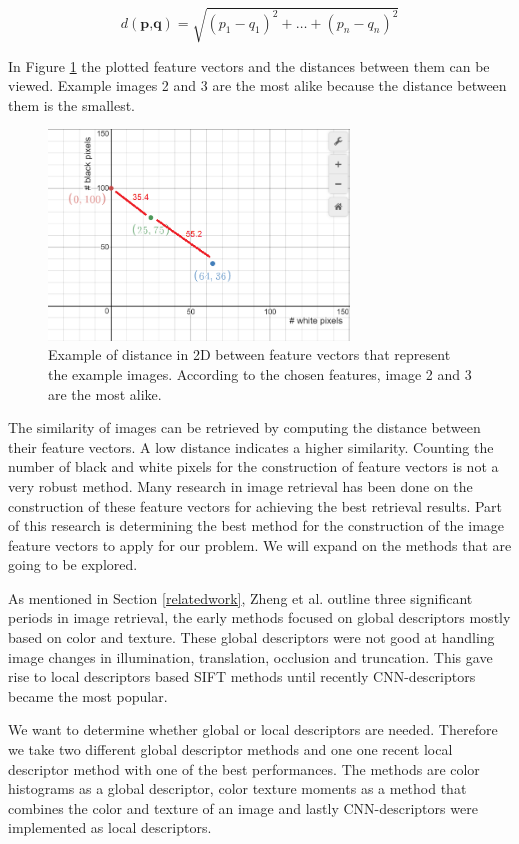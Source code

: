 \documentclass{article}
\begin{document}
\[d(\textbf{p,q}) = \sqrt{(p_1 - q_1)^2 + \dots + (p_n - q_n)^2} \]

In Figure \ref{fig:distanceexample} the plotted feature vectors and the distances between them can be viewed. Example images 2 and 3 are the most alike because the distance between them is the smallest. 

\begin{figure}[H]
	\includegraphics[width=8cm]{images/distanceexample.png}
	\centering
	\caption{Example of distance in 2D between feature vectors that represent the example images. According to the chosen features, image 2 and 3 are the most alike.}
	\label{fig:distanceexample}
\end{figure}

The similarity of images can be retrieved by computing the distance between their feature vectors. A low distance indicates a higher similarity. Counting the number of black and white pixels for the construction of feature vectors is not a very robust method. Many research in image retrieval has been done on the construction of these feature vectors for achieving the best retrieval results. Part of this research is determining the best method for the construction of the image feature vectors to apply for our problem. We will expand on the methods that are going to be explored. 

As mentioned in Section \ref{relatedwork}, Zheng et al. \cite{zheng2018sift} outline three significant periods in image retrieval, the early methods focused on global descriptors mostly based on color and texture. These global descriptors were not good at handling image changes in illumination, translation, occlusion and truncation. This gave rise to local descriptors based SIFT methods until recently CNN-descriptors became the most popular. 

We want to determine whether global or local descriptors are needed. Therefore we take two different global descriptor methods and one one recent local descriptor method with one of the best performances. The methods are color histograms as a global descriptor, color texture moments \cite{yu2002colortexturemoments} as a method that combines the color and texture of an image and lastly CNN-descriptors were implemented as local descriptors.
\end{document}
